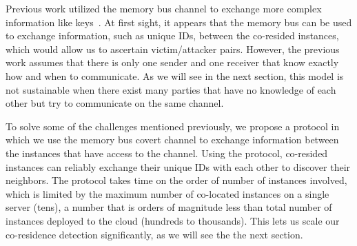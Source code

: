 Previous work utilized the memory bus channel to exchange more complex
information like keys~\cite{wuusenix2012}. At first sight, it appears that the
memory bus can be used to exchange information, such as unique IDs, between the
co-resided instances, which would allow us to ascertain victim/attacker pairs.
However, the previous work assumes that there is only one sender and one
receiver that know exactly how and when to communicate. As we will see in the
next section, this model is not sustainable when there exist many parties that
have no knowledge of each other but try to communicate on the same channel.

To solve some of the challenges mentioned previously, we propose a protocol in
which we use the memory bus covert channel to exchange information between the
instances that have access to the channel. Using the protocol, co-resided
instances can reliably exchange their unique IDs with each other to discover
their neighbors. The protocol takes time on the order of number of instances
involved, which is limited by the maximum number of co-located instances on a
single server (tens), a number that is orders of magnitude less than total
number of instances deployed to the cloud (hundreds to thousands).  This lets us
scale our co-residence detection significantly, as we will see the the next
section.

